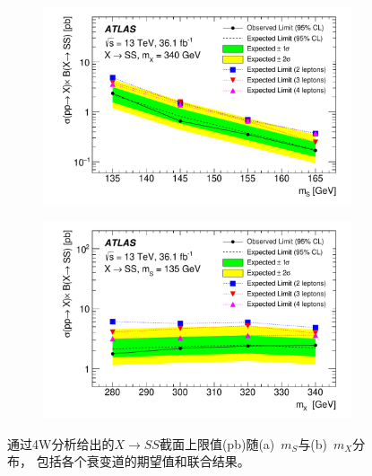 \begin{figure}
  \centering
 \begin{subfigure}[b]{0.45\textwidth}
  \includegraphics[width=.85\textwidth]{fig/4W-Paper-36ifb_Paper_figures_limits_limit-comb-SS-AllSys-mS.pdf}
 \end{subfigure}
 \begin{subfigure}[b]{0.45\textwidth}
  \includegraphics[width=.85\textwidth]{fig/4W-Paper-36ifb_Paper_figures_limits_limit-comb-SS-AllSys-mX.pdf}
 \end{subfigure}
  \caption{通过4W分析给出的$X\rightarrow SS$截面上限值(pb)随(a)~$m_S$与(b)~$m_X$分布，
包括各个衰变道的期望值和联合结果。}
  \label{fig:limit-comb-SS-mS}
\end{figure}

